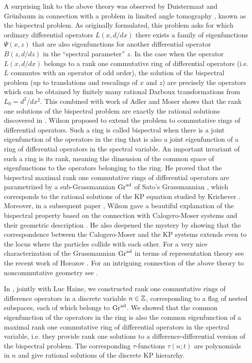 \documentclass[11pt,reqno]{amsart}
\theoremstyle{definition}
\numberwithin{equation}{section}
\begin{document}
A surprising link to the above theory was observed by 
Duistermaat and Gr\"unbaum \cite{DG} in connection with a problem in limited 
angle tomography \cite{Gr}, known as the bispectral problem.  As originally 
formulated, this problem asks for which ordinary
differential operators $L(x,d/dx)$ there exists a family of eigenfunctions 
$\Psi(x,z)$ that are also eigenfunctions for another differential operator 
$B(z,d/dz)$ in the ``spectral parameter'' $z$. In the case when the operator 
$L(x,d/dx)$ belongs to a rank one commutative ring of differential operators
(i.e. $L$ commutes with an operator of odd order), the solution of the 
bispectral problem (up to translations and rescalings
of $x$ and $z$) are precisely the operators which can be obtained by finitely 
many rational Darboux transformations from $L_0=d^2/dx^2$. This combined with 
work of Adler and Moser \cite{AM} shows that the rank one solutions of the 
bispectral problem are exactly the rational solutions discovered in 
\cite{AMcKM}. 
Wilson \cite{W1} proposed to extend the problem to commutative 
rings of differential operators. Such a ring is called bispectral when 
there is a joint eigenfunction of the operators in the ring that is also a 
joint eigenfunction of a ring of differential operators in the spectral 
variable. An important invariant of such a 
ring is its rank, meaning the dimension of the common space of eigenfunctions 
to the operators belonging to the ring. He proved that the bispectral maximal 
rank one commutative rings of differential operators are parametrized by a 
sub-Grassmannian $\mathrm{Gr}^{\mathrm{ad}}$ of Sato's Grassmannian \cite{SS}, which corresponds 
to the rational solutions of the KP equation studied by Krichever \cite{K}. 
Moreover, in a subsequent paper \cite{W2}, Wilson gave a beautiful explanation 
of the bispectral property based on the connection with Calogero-Moser systems 
and their geometric description \cite{KKS}. He also deepened the mystery by 
showing that the correspondence between the Calogero-Moser and the 
KP systems extends even to the locus where the particles collide with each 
other. For a very nice characterization 
of the Grassmannian $\mathrm{Gr}^{\mathrm{ad}}$ in terms of representation theory see the recent 
work of Horozov \cite{Hor}. For an intriguing connection of the above 
theory to noncommutative geometry see \cite{BW}.

In \cite{HI}, jointly with Luc Haine, we constructed rank one commutative 
rings of difference operators in a discrete variable $n\in\mathbb Z$, 
corresponding to a flag of nested subspaces, 
each of which belongs to $\mathrm{Gr}^{\mathrm{ad}}$. We showed that the common eigenfunction 
of the operators in the ring is also the common eigenfunction of a 
maximal rank one commutative ring of differential operators in the 
spectral variable, i.e. they provide rank one solutions to a 
difference-differential version of the bispectral problem. The corresponding 
$\tau$-functions $\tau(n;t)$ are polynomials in $n$ and give rational 
solutions of the discrete KP hierarchy. 
\end{document}
